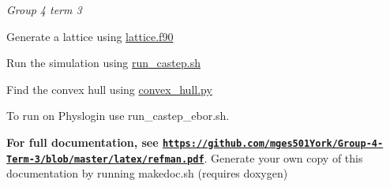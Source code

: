 {\itshape Group 4 term 3}


\begin{DoxyEnumerate}
\item Generate a lattice using {\ttfamily \hyperlink{lattice_8f90}{lattice.\+f90}}
\item Run the simulation using {\ttfamily \hyperlink{run__castep_8sh}{run\+\_\+castep.\+sh}}
\item Find the convex hull using {\ttfamily \hyperlink{convex__hull_8py}{convex\+\_\+hull.\+py}}
\end{DoxyEnumerate}

To run on Physlogin use {\ttfamily run\+\_\+castep\+\_\+ebor.\+sh}.

{\bfseries For full documentation, see \href{https://github.com/mges501York/Group-4-Term-3/blob/master/latex/refman.pdf}{\tt https\+://github.\+com/mges501\+York/\+Group-\/4-\/\+Term-\/3/blob/master/latex/refman.\+pdf}}. Generate your own copy of this documentation by running {\ttfamily makedoc.\+sh} (requires {\ttfamily doxygen}) 
